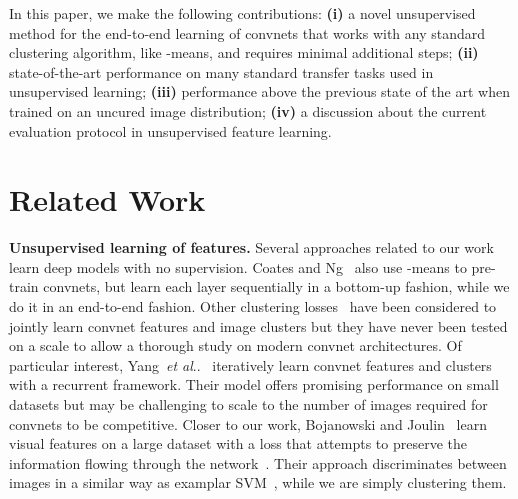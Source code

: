 \documentclass[runningheads]{llncs}
\makeatletter
\DeclareRobustCommand\onedot{\futurelet\@let@token\@onedot}
\def\@onedot{\ifx\@let@token.\else.\null\fi\xspace}
\def\etal{\emph{et al}\onedot}
\makeatother
\begin{document}
In this paper, we make the following contributions:
\textbf{(i)} a novel unsupervised method for the end-to-end learning of convnets that works with any standard clustering algorithm, like -means, and requires minimal additional steps;
\textbf{(ii)} state-of-the-art performance on many standard transfer tasks used in unsupervised learning;
\textbf{(iii)} performance above the previous state of the art when trained on an uncured image distribution;
\textbf{(iv)} a discussion about the current evaluation protocol in unsupervised feature learning.

 



\section{Related Work}





\noindent\textbf{Unsupervised learning of features.}
Several approaches related to our work learn deep models with no supervision.
Coates and Ng~\cite{coates2012learning} also use -means to pre-train convnets, but learn each layer sequentially
in a bottom-up fashion, while we do it in an end-to-end fashion.
Other clustering losses~\cite{yang2016joint,xie2016unsupervised,dosovitskiy2014discriminative,liao2016learning} 
have been considered to jointly learn 
convnet features and image clusters but they have never been tested on a scale to allow a thorough study on modern convnet architectures.
Of particular interest,
Yang~\etal~\cite{yang2016joint} iteratively learn convnet features and clusters with a recurrent framework.
Their model offers promising performance on small datasets but may be 
challenging to scale to the number of images required for convnets to be competitive.
Closer to our work, Bojanowski and Joulin~\cite{bojanowski2017unsupervised} learn visual features on a large dataset with
a loss that attempts to preserve the information flowing through the network~\cite{linsker1988towards}. 
Their approach discriminates between images in a similar way as examplar SVM~\cite{malisiewicz2011ensemble}, while we are simply clustering them.
\\
\end{document}
